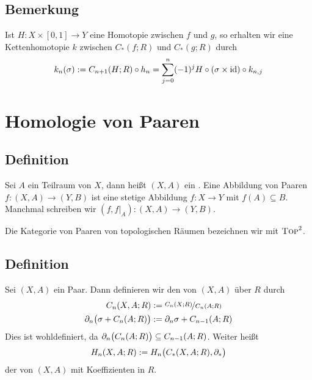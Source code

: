 
\subsection[Bemerkung: Konstruktion einer Kettenhomotopie aus einer Homotopie]{Bemerkung} %
\label{sub:713}
Ist $H \colon X \times [0,1] \to Y$ eine Homotopie zwischen $f$ und $g$, so erhalten wir eine Kettenhomotopie $k$ zwischen $C_*(f;R)$ und $C_*(g;R)$ durch
\[
	k_n(\sigma) := C_{n+1}(H;R) \circ h_n = \sum_{j=0}^{n} (-1)^j H \circ (\sigma \times \id) \circ k_{n,j}
\]
\newpage

\section{Homologie von Paaren} %
\label{sec:8}

\subsection[Definition: Paar von topologischen Räumen]{Definition} %
\label{sub:81}
Sei $A$ ein Teilraum von $X$, dann heißt $(X,A)$ ein . Eine Abbildung von Paaren $f \colon (X,A) \to (Y,B)$ ist eine stetige Abbildung
$f \colon X \to Y$ mit $f(A) \subseteq B$. Manchmal schreiben wir $(f,f|_{A}) \colon (X,A) \to (Y,B)$. 

\noindent Die Kategorie von Paaren von topologischen Räumen bezeichnen wir mit $\TOP^2$.

\subsection[Definition: Singulärer Kettenkomplex und Homologiemodul von Paaren]{Definition} %
\label{sub:82}
Sei $(X,A)$ ein Paar. Dann definieren wir den  von $(X,A)$ über $R$ durch
\begin{align*}
	C_n(X,A;R) &:= \nicefrac{C_n(X;R)}{C_n(A;R)} \\
	\partial_n \enbrace[\big]{\sigma+ C_n(A;R)} &:= \partial_n \sigma + C_{n-1}(A;R)
\end{align*}
Dies ist wohldefiniert, da $\partial_n \enbrace[\big]{C_n(A;R)} \subseteq C_{n-1}(A;R)$. Weiter heißt
\[
	H_n(X,A;R) := H_n \enbrace[\big]{C_*(X,A;R),\partial_*} 
\]
der  von $(X,A)$ mit Koeffizienten in $R$.

